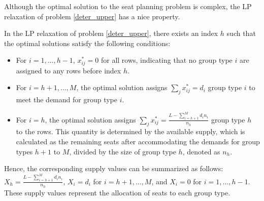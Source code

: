 

Although the optimal solution to the seat planning problem is complex, the LP relaxation of problem \eqref{deter_upper} has a nice property.

\begin{prop}\label{sol_relax_deter}
In the LP relaxation of problem \eqref{deter_upper}, there exists an index $h$ such that the optimal solutions satisfy the following conditions:

\begin{itemize}
  \item For $i = 1,\ldots, h-1$, $x_{ij}^{*} = 0$ for all rows, indicating that no group type $i$ are assigned to any rows before index $h$.
  \item For $i = h+1,\ldots, M$, the optimal solution assigns $\sum_{j} x_{ij}^{*} = d_{i}$ group type $i$ to meet the demand for group type $i$.
  \item For $i = h$, the optimal solution assigns $\sum_{j} x_{ij}^{*} = \frac{L - \sum_{i = h+1}^{M} {d_i n_i}}{n_h}$ group type $h$ to the rows. This quantity is determined by the available supply, which is calculated as the remaining seats after accommodating the demands for group types $h+1$ to $M$, divided by the size of group type $h$, denoted as $n_h$.
\end{itemize}

Hence, the corresponding supply values can be summarized as follows: $X_h = \frac{L - \sum_{i = h+1}^{M} {d_i n_i}}{n_h}$, $X_{i} = d_{i}$ for $i = h+1,\ldots, M$, and $X_{i} = 0$ for $i = 1, \ldots, h-1$. These supply values represent the allocation of seats to each group type.
\end{prop}





